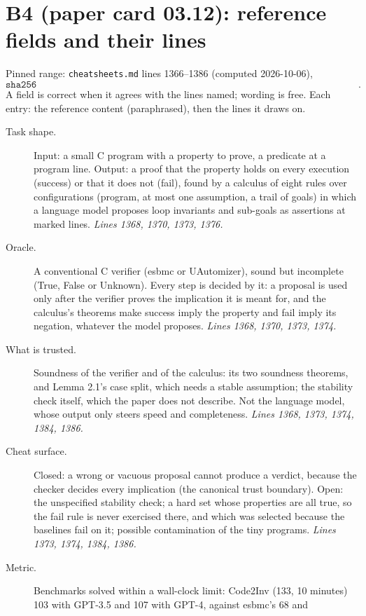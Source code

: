 \documentclass[11pt]{article}
\begin{document}
\section*{B4 (paper card 03.12): reference fields and their lines}

Pinned range: \texttt{cheatsheets.md} lines 1366--1386 (computed 2026-10-06),
\[ \texttt{sha256 a821f639a8a72dc663372dad601c93a6ea0fbc8cee85faf9421669c8ac521414}. \]
A field is correct when it agrees with the lines named; wording is free. Each
entry: the reference content (paraphrased), then the lines it draws on.

\begin{description}
\item[Task shape.] Input: a small C program with a property to prove, a
  predicate at a program line. Output: a proof that the property holds on
  every execution (success) or that it does not (fail), found by a calculus of
  eight rules over configurations (program, at most one assumption, a trail
  of goals) in which a language model proposes loop invariants and sub-goals
  as assertions at marked lines. \emph{Lines 1368, 1370, 1373, 1376.}
\item[Oracle.] A conventional C verifier (esbmc or UAutomizer), sound but
  incomplete (True, False or Unknown). Every step is decided by it: a
  proposal is used only after the verifier proves the implication it is
  meant for, and the calculus's theorems make success imply the property and
  fail imply its negation, whatever the model proposes. \emph{Lines 1368,
  1370, 1373, 1374.}
\item[What is trusted.] Soundness of the verifier and of the calculus: its
  two soundness theorems, and Lemma 2.1's case split, which needs a stable
  assumption; the stability check itself, which the paper does not describe.
  Not the language model, whose output only steers speed and completeness.
  \emph{Lines 1368, 1373, 1374, 1384, 1386.}
\item[Cheat surface.] Closed: a wrong or vacuous proposal cannot produce a
  verdict, because the checker decides every implication (the canonical trust
  boundary). Open: the unspecified stability check; a hard set whose
  properties are all true, so the fail rule is never exercised there, and
  which was selected because the baselines fail on it; possible contamination
  of the tiny programs. \emph{Lines 1373, 1374, 1384, 1386.}
\item[Metric.] Benchmarks solved within a wall-clock limit: Code2Inv (133, 10
  minutes) 103 with GPT-3.5 and 107 with GPT-4, against esbmc's 68 and

\end{description}
\end{document}
